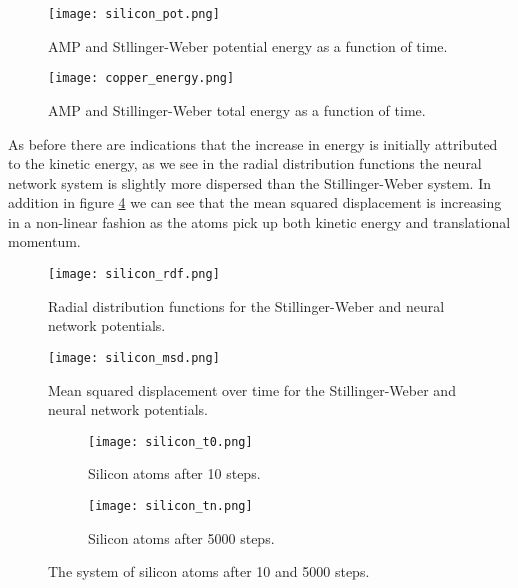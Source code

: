 \begin{figure}[H]
    \centering
    \texttt{[image: silicon\_pot.png]}
    \caption{AMP and Stllinger-Weber potential energy as a function of time.}
    \label{fig:silicon-pot}
\end{figure}

\begin{figure}[H]
    \centering
    \texttt{[image: copper\_energy.png]}
    \caption{AMP and Stillinger-Weber total energy as a function of time.}
    \label{fig:silicon-energy}
\end{figure}

As before there are indications that the increase in energy is initially attributed
to the kinetic energy, as we see in the radial distribution functions the neural network
system is slightly more dispersed than the Stillinger-Weber system.
In addition in figure \ref{fig:silicon-msd} we can see that the mean squared
displacement is increasing in a non-linear fashion as the atoms pick up
both kinetic energy and translational momentum.

\begin{figure}[H]
    \centering
    \texttt{[image: silicon\_rdf.png]}
    \caption{Radial distribution functions for the Stillinger-Weber and
        neural network potentials.}
    \label{fig:silicon-rdf}
\end{figure}

\begin{figure}[H]
    \centering
    \texttt{[image: silicon\_msd.png]}
    \caption{Mean squared displacement over time for the Stillinger-Weber
        and neural network potentials.}
    \label{fig:silicon-msd}
\end{figure}

\begin{figure}[H]
\begin{adjustbox}{max width=1.2\linewidth,center}
\centering
  \begin{subfigure}[b]{0.55\textwidth}
      \texttt{[image: silicon\_t0.png]}
      \caption{Silicon atoms after 10 steps.}
  \end{subfigure}
  \hfill
  \begin{subfigure}[b]{0.55\textwidth}
      \texttt{[image: silicon\_tn.png]}
      \caption{Silicon atoms after 5000 steps.}
  \end{subfigure}
\end{adjustbox}
    \caption{The system of silicon atoms after 10 and 5000 steps.}
    \label{fig:silicon-time}
\end{figure}

